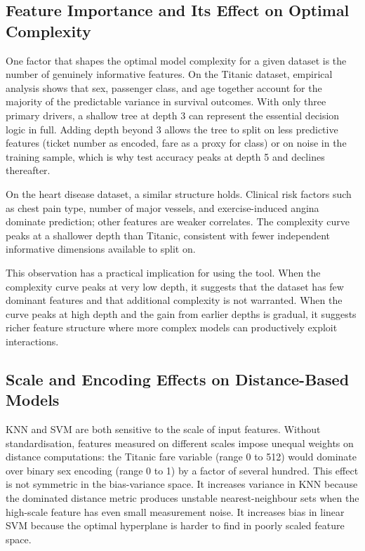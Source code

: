 \documentclass[conference]{IEEEtran}
\begin{document}
\subsection{Feature Importance and Its Effect on Optimal Complexity}

One factor that shapes the optimal model complexity for a given dataset is the number of genuinely informative features. On the Titanic dataset, empirical analysis shows that sex, passenger class, and age together account for the majority of the predictable variance in survival outcomes. With only three primary drivers, a shallow tree at depth 3 can represent the essential decision logic in full. Adding depth beyond 3 allows the tree to split on less predictive features (ticket number as encoded, fare as a proxy for class) or on noise in the training sample, which is why test accuracy peaks at depth 5 and declines thereafter.

On the heart disease dataset, a similar structure holds. Clinical risk factors such as chest pain type, number of major vessels, and exercise-induced angina dominate prediction; other features are weaker correlates. The complexity curve peaks at a shallower depth than Titanic, consistent with fewer independent informative dimensions available to split on.

This observation has a practical implication for using the tool. When the complexity curve peaks at very low depth, it suggests that the dataset has few dominant features and that additional complexity is not warranted. When the curve peaks at high depth and the gain from earlier depths is gradual, it suggests richer feature structure where more complex models can productively exploit interactions.

\subsection{Scale and Encoding Effects on Distance-Based Models}

KNN and SVM are both sensitive to the scale of input features. Without standardisation, features measured on different scales impose unequal weights on distance computations: the Titanic fare variable (range 0 to 512) would dominate over binary sex encoding (range 0 to 1) by a factor of several hundred. This effect is not symmetric in the bias-variance space. It increases variance in KNN because the dominated distance metric produces unstable nearest-neighbour sets when the high-scale feature has even small measurement noise. It increases bias in linear SVM because the optimal hyperplane is harder to find in poorly scaled feature space.
\end{document}
